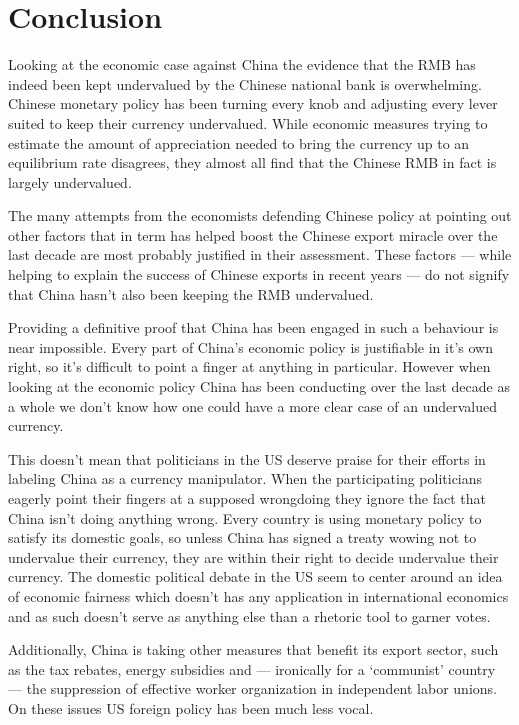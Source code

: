 \section{Conclusion}
\label{sec:conclusion}

Looking at the economic case against China the evidence that the RMB has 
indeed been kept undervalued by the Chinese national bank is 
overwhelming. Chinese monetary policy has been turning every knob and 
adjusting every lever suited to keep their currency undervalued.  While 
economic measures trying to estimate the amount of appreciation needed 
to bring the currency up to an equilibrium rate disagrees, they almost 
all find that the Chinese RMB in fact is largely undervalued.

The many attempts from the economists defending Chinese policy at 
pointing out other factors that in term has helped boost the Chinese 
export miracle over the last decade are most probably justified in their 
assessment. These factors --- while helping to explain the success of 
Chinese exports in recent years --- do not signify that China hasn't 
also been keeping the RMB undervalued.

Providing a definitive proof that China has been engaged in such a 
behaviour is near impossible. Every part of China's economic policy is 
justifiable in it's own right, so it's difficult to point a finger at 
anything in particular. However when looking at the economic policy 
China has been conducting over the last decade as a whole we don't know 
how one could have a more clear case of an undervalued currency.

This doesn't mean that politicians in the US deserve praise for their 
efforts in labeling China as a currency manipulator. When the 
participating politicians eagerly point their fingers at a supposed 
wrongdoing they ignore the fact that China isn't doing anything wrong.
Every country is using monetary policy to satisfy its domestic goals, so
unless China has signed a treaty wowing not to undervalue their 
currency, they are within their right to decide undervalue their 
currency. The domestic political debate in the US seem to center around 
an idea of economic fairness which doesn't has any application in 
international economics and as such doesn't serve as anything else than 
a rhetoric tool to garner votes.

Additionally, China is taking other measures that benefit its export 
sector, such as the tax rebates, energy subsidies and --- ironically for 
a `communist' country --- the suppression of effective worker 
organization in independent labor unions. On these issues US foreign 
policy has been much less vocal. 

